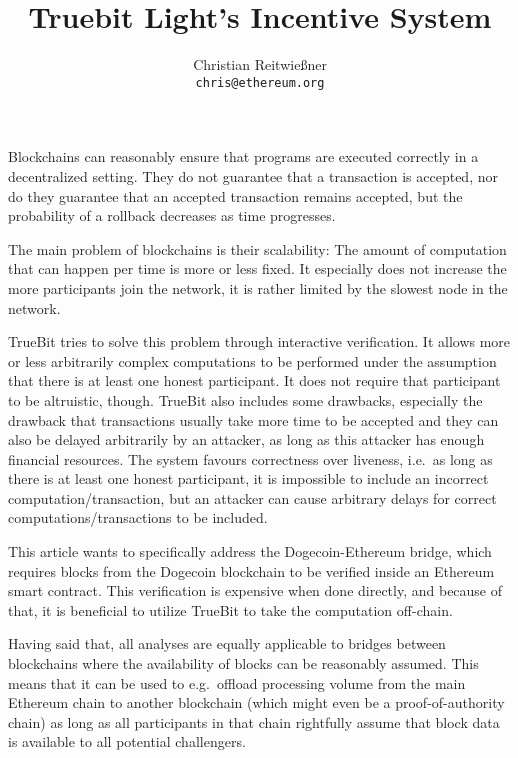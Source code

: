 \documentclass[11pt,letterpaper]{article}
\date{}
\begin{document}


\title{Truebit Light's Incentive System}

\author{Christian Reitwießner \\ 
{\tt chris@ethereum.org}}


\maketitle



Blockchains can reasonably ensure that programs are executed correctly in a decentralized setting.
They do not guarantee that a transaction is accepted, nor do they guarantee that an accepted transaction remains
accepted, but the probability of a rollback decreases as time progresses.

The main problem of blockchains is their scalability: The amount of computation that can happen per time is more or less fixed.
It especially does not increase the more participants join the network, it is rather limited by the slowest node in the
network.

TrueBit tries to solve this problem through interactive verification. It allows more or less arbitrarily complex computations to
be performed under the assumption that there is at least one honest participant. It does not require that participant
to be altruistic, though. TrueBit also includes some drawbacks, especially the drawback that transactions usually take
more time to be accepted and they can also be delayed arbitrarily by an attacker, as long as this attacker has enough
financial resources. The system favours correctness over liveness, i.e.\ as long as there is at least one honest
participant, it is impossible to include an incorrect computation/transaction, but an attacker can cause arbitrary delays for
correct computations/transactions to be included.

This article wants to specifically address the Dogecoin-Ethereum bridge, which requires blocks from the Dogecoin
blockchain to be verified inside an Ethereum smart contract. This verification is expensive when done directly,
and because of that, it is beneficial to utilize TrueBit to take the computation off-chain.

Having said that, all analyses are equally applicable to bridges between blockchains where the availability of blocks
can be reasonably assumed. This means that it can be used to e.g.\ offload processing volume from the main Ethereum
chain to another blockchain (which might even be a proof-of-authority chain) as long as all participants in that chain
rightfully assume that block data is available to all potential challengers.
\end{document}
